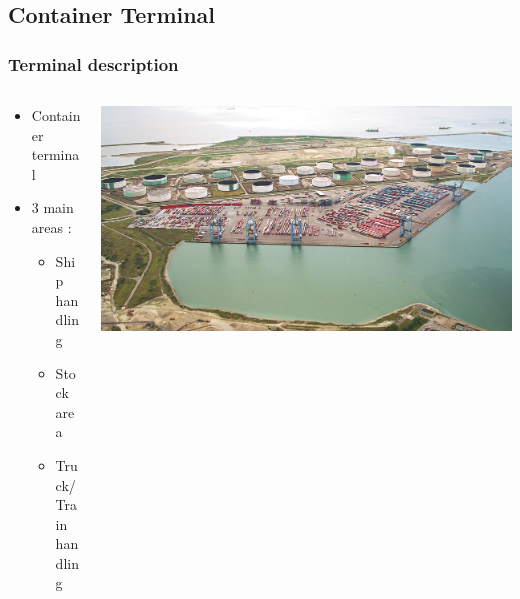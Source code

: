 \documentclass{beamer}
\begin{document}
\subsection*{Container Terminal}
\begin{frame}
\frametitle{Terminal description}

 	\begin{columns}
 	 	\begin{column}[l]{6cm}
			\begin{itemize}
				\item Container terminal
				\item 3 main areas : 
				\begin{itemize}
 					\item Ship handling
					\item Stock area
					\item Truck/Train handling
				\end{itemize}
			\end{itemize}
		\end{column}
 	 	\begin{column}[r]{4.7cm}
			\begin{flushright}
				\includegraphics[height=.30\textheight]{fig/terminalDeNormandie.jpg}
			\end{flushright}
		\end{column}
 	\end{columns}


\end{frame}
\end{document}
